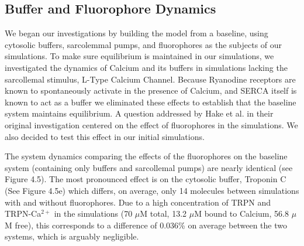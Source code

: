 \documentclass[12pt]{ucsddissertation}
\begin{document}
\subsection{Buffer and Fluorophore Dynamics}
We began our investigations by building the model from a baseline, using cytosolic buffers, sarcolemmal pumps, and fluorophores as the subjects of our simulations. To make sure equilibrium is maintained in our simulations, we investigated the dynamics of Calcium and its buffers in simulations lacking the sarcollemal stimulus, L-Type Calcium Channel. Because Ryanodine receptors are known to spontaneously activate in the presence of Calcium\cite{Cheng1993,Cannell1995}, and SERCA itself is known to act as a buffer\cite{Higgins2006} we eliminated these effects to establish that the baseline system maintains equilibrium. A question addressed by Hake et al. in their original investigation centered on the effect of fluorophores in the simulations. We also decided to test this effect in our initial simulations. 

The system dynamics comparing the effects of the fluorophores on the baseline system (containing only buffers and sarcollemal pumps) are nearly identical (see Figure 4.5). The most pronounced effect is on the cytosolic buffer, Troponin C (See Figure 4.5e) which differs, on average, only 14 molecules between simulations with and without fluorophores. Due to a high concentration of TRPN and TRPN-Ca$^{2+}$ in the simulations (70 $\mu$M total, 13.2 $\mu$M bound to Calcium, 56.8 $\mu$M free), this corresponds to a difference of 0.036\% on average between the two systems, which is arguably negligible. 
\end{document}
